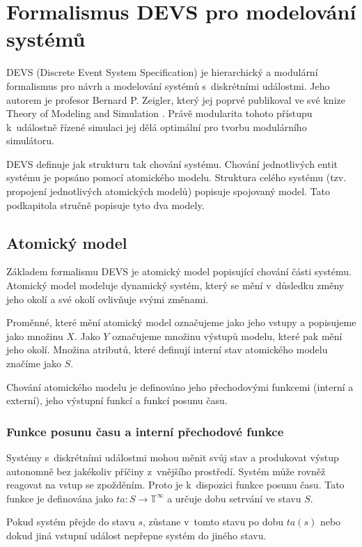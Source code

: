 \section{Formalismus DEVS pro modelování systémů}

DEVS (Discrete Event System Specification) je hierarchický a modulární formalismus pro návrh a modelování systémů s~diskrétními událostmi. Jeho autorem je profesor Bernard P. Zeigler, který jej poprvé publikoval ve své knize Theory of Modeling and Simulation \cite{zeigler}. Právě modularita tohoto přístupu k~událostně řízené simulaci jej dělá optimální pro tvorbu modulárního simulátoru.

DEVS definuje jak strukturu tak chování systému. Chování jednotlivých entit systému je popsáno pomocí atomického modelu. Struktura celého systému (tzv. propojení jednotlivých atomických modelů) popisuje spojovaný model. Tato podkapitola stručně popisuje tyto dva modely.

\subsection{Atomický model}

Základem formalismu DEVS je atomický model popisující chování části systému. Atomický model modeluje dynamický systém, který se mění v~důsledku změny jeho okolí a své okolí ovlivňuje svými změnami.

Proměnné, které mění atomický model označujeme jako jeho vstupy a popisujeme jako množinu $X$. Jako $Y$ označujeme množinu výstupů modelu, které pak mění jeho okolí. Množina atributů, které definují interní stav atomického modelu značíme jako $S$.

Chování atomického modelu je definováno jeho přechodovými funkcemi (interní a externí), jeho výstupní funkcí a funkcí posunu času.

\subsubsection{Funkce posunu času a interní přechodové funkce}

Systémy s~diskrétními událostmi mohou měnit svůj stav a produkovat výstup autonomně bez jakékoliv příčiny z~vnějšího prostředí. Systém může rovněž reagovat na vstup se zpožděním. Proto je k~dispozici funkce posunu času. Tato funkce je definována jako $ta:S \rightarrow \mathbb{T}^\infty$ a určuje dobu setrvání ve stavu $S$.

Pokud systém přejde do stavu $s$, zůstane v~tomto stavu po dobu $ta(s)$ nebo dokud jiná vstupní událost nepřepne systém do jiného stavu.

